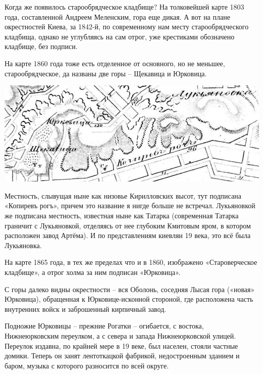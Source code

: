 Когда же появилось старообрядческое кладбище? На толковейшей карте 1803 года, составленной Андреем Меленским, гора еще дикая. А вот на плане окрестностей Киева, за 1842-й, по современному нам месту старообрядческого кладбища, однако не углубляясь на сам отрог, уже крестиками обозначено кладбище, без подписи.

На карте 1860 года тоже есть отделенное от основного, но не меньшее, старообрядческое, да названы две горы – Щекавица и Юрковица.

\begin{center}
\includegraphics[width=\linewidth]{chast-kirvys/yourk/1860-part.jpg}
\end{center} 

Местность, слывущая ныне как низовье Кирилловских высот, тут подписана «Копиревъ рогъ», причем это название я нигде больше не встречал. Лукьяновкой же подписана местность, известная ныне как Татарка (современная Татарка граничит с Лукьяновкой, отделяясь от нее глубоким Кмитовым яром, в котором расположен завод Артёма). И по представлениям киевлян 19 века, это всё была Лукьяновка.


На карте 1865 года, в тех же пределах что и в 1860, изображено «Староверческое кладбище», а отрог холма за ним подписан «Юрковица».
  
С горы далеко видны окрестности – вся Оболонь, соседняя Лысая гора («новая» Юрковица), обращенная к Юрковице-исконной стороной, где расположена часть внутренних войск и заброшенный кирпичный завод.

Подножие Юрковицы – прежние Рогатки – огибается, с востока, Нижнеюрковским переулком, а с севера и запада Нижнеюрковской улицей. Переулок издавна, по крайней мере в 19 веке, был населен, стояли частные домики. Теперь он занят лентоткацкой фабрикой, недостроенным зданием и баром, музыка с которого разносится по всей округе. 

